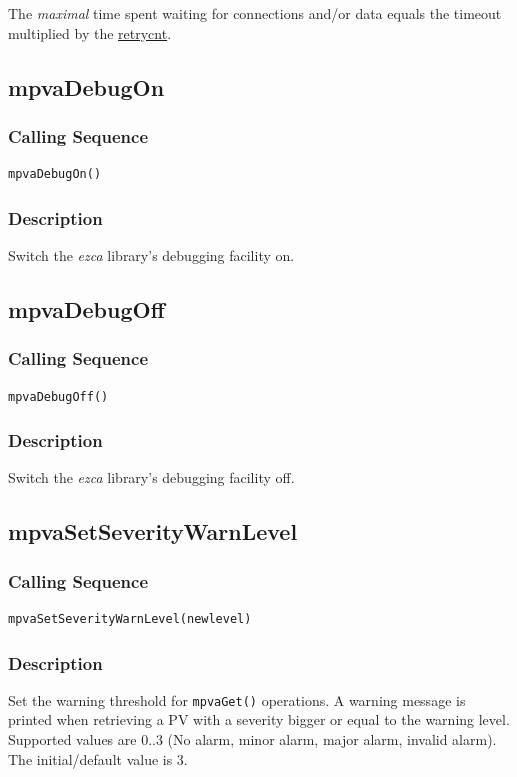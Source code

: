 \documentclass{article}
\newcommand{\ezca}{\ita{ezca}}
\newcommand{\com}[1]{{\tt #1}}
\newcommand{\pbrk}{\pagebreak[3]}
\newcommand{\ita}[1]{\emph{#1}}
\newcommand{\sevrange}{$0..3$}
\renewcommand{\sevrange}{0..3}
\renewcommand{\pbrk}{}
\begin{document}
The {\em maximal} time spent waiting for connections and/or data equals the
timeout multiplied by the
\hyperref{retry count}{retry count (see }{ )}{retrycnt}.

\vspace*{\fill}
\pbrk
\subsection{mpvaDebugOn}
\subsubsection{Calling Sequence}
\begin{verbatim}
mpvaDebugOn()
\end{verbatim}
\subsubsection{Description}
Switch the \ezca{} library's debugging facility on.

\vspace*{\fill}
\pbrk
\subsection{mpvaDebugOff}
\subsubsection{Calling Sequence}
\begin{verbatim}
mpvaDebugOff()
\end{verbatim}
\subsubsection{Description}
Switch the \ezca{} library's debugging facility off.

\vspace*{\fill}
\pbrk
\subsection{mpvaSetSeverityWarnLevel}
\label{swarnlevel}
\subsubsection{Calling Sequence}
\begin{verbatim}
mpvaSetSeverityWarnLevel(newlevel)
\end{verbatim}
\subsubsection{Description}
Set the warning threshold for \com{mpvaGet()} operations.
A warning message is printed when retrieving a PV with a severity bigger
or equal to the warning level. Supported values are \sevrange{} (No alarm,
minor alarm, major alarm, invalid alarm). The initial/default value is 3.
\end{document}
